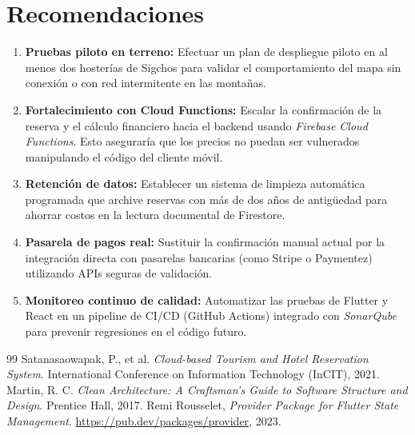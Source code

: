 \documentclass[12pt,letterpaper]{report}
\begin{document}
\chapter{Recomendaciones}
\begin{enumerate}
  \item \textbf{Pruebas piloto en terreno:} Efectuar un plan de despliegue piloto en al menos dos hosterías de Sigchos para validar el comportamiento del mapa sin conexión o con red intermitente en las montañas.
  \item \textbf{Fortalecimiento con Cloud Functions:} Escalar la confirmación de la reserva y el cálculo financiero hacia el backend usando \textit{Firebase Cloud Functions}. Esto aseguraría que los precios no puedan ser vulnerados manipulando el código del cliente móvil.
  \item \textbf{Retención de datos:} Establecer un sistema de limpieza automática programada que archive reservas con más de dos años de antigüedad para ahorrar costos en la lectura documental de Firestore.
  \item \textbf{Pasarela de pagos real:} Sustituir la confirmación manual actual por la integración directa con pasarelas bancarias (como Stripe o Paymentez) utilizando APIs seguras de validación.
  \item \textbf{Monitoreo continuo de calidad:} Automatizar las pruebas de Flutter y React en un pipeline de CI/CD (GitHub Actions) integrado con \textit{SonarQube} para prevenir regresiones en el código futuro.
\end{enumerate}

\begin{thebibliography}{99}
Satanasaowapak, P., et al. \textit{Cloud-based Tourism and Hotel Reservation System}. International Conference on Information Technology (InCIT), 2021.
Martin, R. C. \textit{Clean Architecture: A Craftsman's Guide to Software Structure and Design}. Prentice Hall, 2017.
Remi Rousselet, \textit{Provider Package for Flutter State Management}. \url{https://pub.dev/packages/provider}, 2023.
\end{thebibliography}
\end{document}
